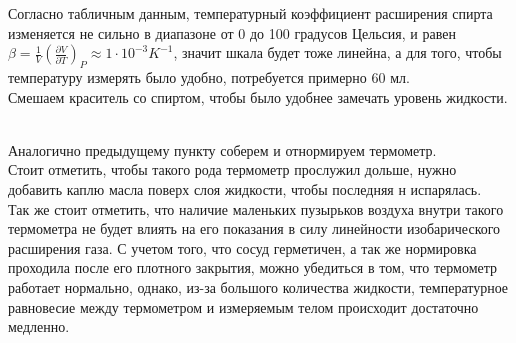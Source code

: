 \begin{minipage}{0.6\textwidth} 
Согласно табличным данным, температурный коэффициент расширения спирта изменяется не сильно в диапазоне от 0 до 100 градусов Цельсия, и равен $\beta = \frac{1}{V}(\frac{\partial V}{\partial T})_P \approx 1\cdot 10^{-3} K^{-1}$, значит шкала будет тоже линейна, а для того, чтобы температуру измерять было удобно, потребуется примерно 60 мл. \\

Смешаем краситель со спиртом, чтобы было удобнее замечать уровень жидкости. \\

 \ 
 
Аналогично предыдущему пункту соберем и отнормируем термометр. \\

Стоит отметить, чтобы такого рода термометр прослужил дольше, нужно добавить каплю масла поверх слоя жидкости, чтобы последняя н испарялась. \\

Так же стоит отметить, что наличие маленьких пузырьков воздуха внутри такого термометра не будет влиять на его показания в силу линейности изобарического расширения газа. С учетом того, что сосуд герметичен, а так же нормировка проходила после его плотного закрытия, можно убедиться в том, что термометр работает нормально, однако, из-за большого количества жидкости, температурное равновесие между термометром и измеряемым телом происходит достаточно медленно. 

\end{minipage}
\begin{minipage}{0.07\textwidth}
\
\end{minipage}
